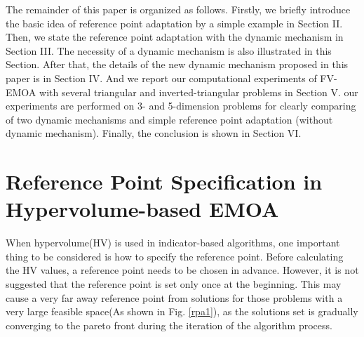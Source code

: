 \documentclass[conference]{IEEEtran}
\begin{document}
The remainder of this paper is organized as follows. 
Firstly, we briefly introduce the basic idea of reference point adaptation by a simple example in Section II.
Then, we state the reference point adaptation with the dynamic mechanism in Section III.
The necessity of a dynamic mechanism is also illustrated in this Section. After that,
the details of the new dynamic mechanism proposed in this paper is in Section IV. 
And we report our computational experiments of FV-EMOA
with several triangular and inverted-triangular problems in Section V. our experiments are performed on
3- and 5-dimension problems for clearly comparing of two dynamic mechanisms and 
simple reference point adaptation (without dynamic mechanism). Finally, the conclusion is shown in Section VI.

%
%
\section{Reference Point Specification in Hypervolume-based EMOA}
When hypervolume(HV) is used in indicator-based algorithms, 
one important thing to be considered is how to specify the reference point.
Before calculating the HV values, a reference point needs to be chosen in advance.
However, it is not suggested that the reference point is set only once at the beginning. 
This may cause a very far away reference point from solutions
for those problems with a very large feasible space(As shown in Fig. \ref{rpa1}),
as the solutions set is gradually converging to the pareto front
during the iteration of the algorithm process.
\end{document}
